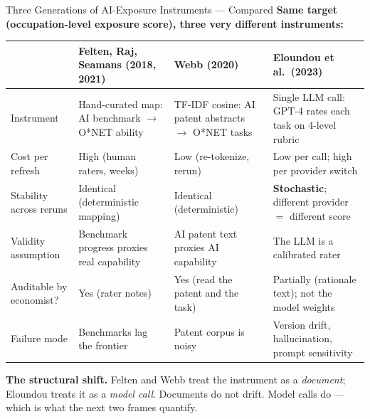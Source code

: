 \begin{frame}{Three Generations of AI-Exposure Instruments --- Compared}
\textbf{Same target (occupation-level exposure score), three very different instruments:}

\medskip
\begin{center}
\renewcommand{\arraystretch}{1.25}
\footnotesize
\begin{tabular}{|p{2.4cm}|p{3.2cm}|p{3.2cm}|p{3.2cm}|}
\hline
& \textbf{Felten, Raj, Seamans (2018, 2021)} & \textbf{Webb (2020)} & \textbf{Eloundou et al.\ (2023)} \\
\hline
Instrument & Hand-curated map: AI benchmark $\to$ O*NET ability & TF-IDF cosine: AI patent abstracts $\to$ O*NET tasks & Single LLM call: GPT-4 rates each task on 4-level rubric \\
\hline
Cost per refresh & High (human raters, weeks) & Low (re-tokenize, rerun) & Low per call; high per provider switch \\
\hline
Stability across reruns & Identical (deterministic mapping) & Identical (deterministic) & \textbf{Stochastic}; different provider $=$ different score \\
\hline
Validity assumption & Benchmark progress proxies real capability & AI patent text proxies AI capability & The LLM is a calibrated rater \\
\hline
Auditable by economist? & Yes (rater notes) & Yes (read the patent and the task) & Partially (rationale text); not the model weights \\
\hline
Failure mode & Benchmarks lag the frontier & Patent corpus is noisy & Version drift, hallucination, prompt sensitivity \\
\hline
\end{tabular}
\end{center}

\medskip
\textbf{The structural shift.} Felten and Webb treat the instrument as a \emph{document}; Eloundou treats it as a \emph{model call}. Documents do not drift. Model calls do --- which is what the next two frames quantify.
\end{frame}

